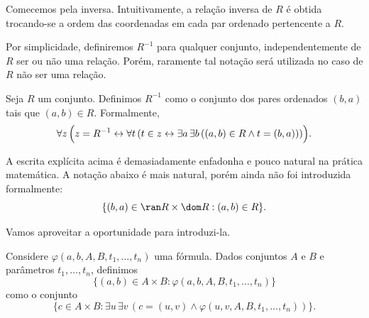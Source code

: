 Comecemos pela inversa.
Intuitivamente, a relação inversa de $R$ é obtida trocando-se a ordem das coordenadas em cada par ordenado pertencente a $R$.

Por simplicidade, definiremos $R^{-1}$ para qualquer conjunto, independentemente de $R$ ser ou não uma relação.
Porém, raramente tal notação será utilizada no caso de $R$ não ser uma relação.

\begin{definition}[$\BST$]\label{def:relacaoInversa}
    Seja $R$ um conjunto.
    Definimos $R^{-1}$ como o conjunto dos pares ordenados $(b,a)$ tais que $(a,b) \in R$.
    Formalmente,
    \[
        \forall z\, \Bigl(z = R^{-1} \leftrightarrow \forall t\, (t \in z \leftrightarrow \exists a\, \exists b\, ((a, b) \in R \land t = (b, a)))\Bigr).
    \]
\end{definition}

A escrita explícita acima é demasiadamente enfadonha e pouco natural na prática matemática.
A notação abaixo é mais natural, porém ainda não foi introduzida formalmente:
\[
    \{(b,a)\in \ran R\times \dom R : (a,b)\in R\}.
\]

Vamos aproveitar a oportunidade para introduzi-la.

\begin{definition}[$\BST$]\label{def:notacaoPorCompreensaoDePares}
    Considere $\varphi(a,b,A,B,t_1,\dots,t_n)$ uma fórmula.
    Dados conjuntos $A$ e $B$ e parâmetros $t_1, \dots, t_n$, definimos
    \[
        \{(a,b)\in A\times B : \varphi(a,b,A,B,t_1,\dots,t_n)\}
    \]
    como o conjunto
    \[
        \{c \in A\times B : \exists u\,\exists v\,(c=(u,v) \land \varphi(u,v,A,B,t_1,\dots,t_n))\}.
    \]
\end{definition}

